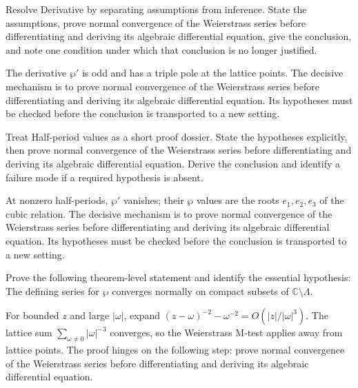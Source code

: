 \begin{problem}\label{prob:iv29-problem-06}
Resolve Derivative by separating assumptions from inference. State the assumptions, prove normal convergence of the Weierstrass series before differentiating and deriving its algebraic differential equation, give the conclusion, and note one condition under which that conclusion is no longer justified.
\end{problem}
\begin{solution}
The derivative $\wp'$ is odd and has a triple pole at the lattice points. The decisive mechanism is to prove normal convergence of the Weierstrass series before differentiating and deriving its algebraic differential equation. Its hypotheses must be checked before the conclusion is transported to a new setting.
\end{solution}

\begin{problem}\label{prob:iv29-problem-07}
Treat Half-period values as a short proof dossier. State the hypotheses explicitly, then prove normal convergence of the Weierstrass series before differentiating and deriving its algebraic differential equation. Derive the conclusion and identify a failure mode if a required hypothesis is absent.
\end{problem}
\begin{solution}
At nonzero half-periods, $\wp'$ vanishes; their $\wp$ values are the roots $e_1,e_2,e_3$ of the cubic relation. The decisive mechanism is to prove normal convergence of the Weierstrass series before differentiating and deriving its algebraic differential equation. Its hypotheses must be checked before the conclusion is transported to a new setting.
\end{solution}

\begin{problem}\label{prob:iv29-problem-08}
Prove the following theorem-level statement and identify the essential hypothesis: The defining series for $\wp$ converges normally on compact subsets of $\mathbb C\setminus\Lambda$.
\end{problem}
\begin{solution}
For bounded $z$ and large $|\omega|$, expand $(z-\omega)^{-2}-\omega^{-2}=O(|z|/|\omega|^3)$. The lattice sum $\sum_{\omega\ne0}|\omega|^{-3}$ converges, so the Weierstrass M-test applies away from lattice points. The proof hinges on the following step: prove normal convergence of the Weierstrass series before differentiating and deriving its algebraic differential equation.
\end{solution}

